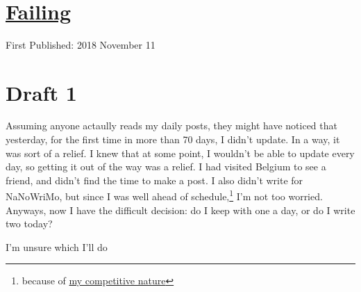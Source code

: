 \documentclass[12pt]{article}[titlepage]
\newcommand{\1}{\={a}}
\newcommand{\2}{\={e}}
\newcommand{\3}{\={\i}}
\newcommand{\4}{\=o}
\newcommand{\5}{\=u}
\newcommand{\6}{\={A}}
\renewcommand{\,}{\textsuperscript{,}}
\begin{document}

\doublespacing
\section{\href{failing.html}{Failing}}
First Published: 2018 November 11
\section{Draft 1}
Assuming anyone actaully reads my daily posts, they might have noticed that yesterday, for the first time in more than 70 days, I didn't update.
In a way, it was sort of a relief.
I knew that at some point, I wouldn't be able to update every day, so getting it out of the way was a relief.
I had visited Belgium to see a friend, and didn't find the time to make a post.
I also didn't write for NaNoWriMo, but since I was well ahead of schedule,\footnote{because of \href{exponential-growth.html}{my competitive nature}} I'm not too worried.
Anyways, now I have the difficult decision: do I keep with one a day, or do I write two today?

I'm unsure which I'll do
\end{document}
